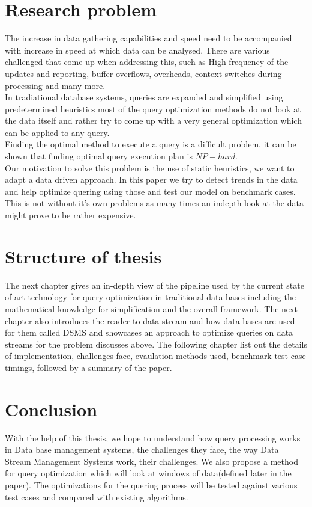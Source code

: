 \section{Research problem}
\label{sec:Problem at hand}
\par The increase in data gathering capabilities and speed need to be accompanied with increase in speed at which data can be analysed. There are various challenged that come up when addressing this, such as High frequency of the updates and reporting, buffer overflows, overheads, context-switches during processing and many more.\\
In tradiational database systems, queries are expanded and simplified using predetermined heuristics most of the query optimization methods do not look at the data itself and rather try to come up with a very general optimization which can be applied to any query.\\
Finding the optimal method to execute a query is a difficult problem, it can be shown that finding optimal query execution plan is $NP-hard$. \\
Our motivation to solve this problem is the use of static heuristics, we want to adapt a data driven approach. In this paper we try to detect trends in the data and help optimize quering using those and test our model on benchmark cases.\\
This is not without it's own problems as many times an indepth look at the data might prove to be rather expensive. 

\section{Structure of thesis}
\label{sec:Structure of thesis}
The next chapter gives an in-depth view of the pipeline used by the current state of art technology for query optimization in traditional data bases including the mathematical knowledge for simplification and the overall framework. The next chapter also introduces the reader to data stream and how data bases are used for them called DSMS and showcases an approach to optimize queries on data streams for the problem discusses above. The following chapter list out the details of implementation, challenges face, evaulation methods used, benchmark test case timings, followed by a summary of the paper.

\section{Conclusion}
\label{sec:Conclusion}
With the help of this thesis, we hope to understand how query processing works in Data base management systems, the challenges they face, the way Data Stream Management Systems work, their challenges. We also propose a method for query optimization which will look at windows of data(defined later in the paper). The optimizations for the quering process will be tested against various test cases and compared with existing algorithms.
